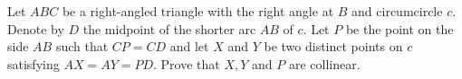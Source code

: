 Let $ABC$ be a right-angled triangle with the right angle at $B$ and circumcircle $c$. Denote by $D$ the midpoint of the shorter arc $AB$ of $c$. Let $P$ be the point on the side $AB$ such that $CP=CD$ and let $X$ and $Y$ be two distinct points on $c$ satisfying $AX=AY=PD$. Prove that $X, Y$ and $P$ are collinear.